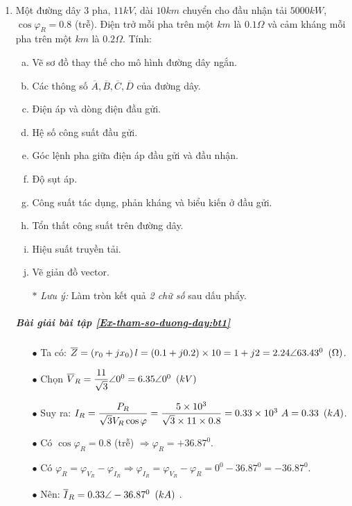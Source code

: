 	\begin{enumerate}
		\item \label{Ex-tham-so-duong-day:bt1} Một đường dây 3 pha, $11 \unit{kV}$, dài $10 \unit{km}$ chuyển cho đầu nhận tải $5000 \unit{kW}$, $\cos \varphi_R = 0.8$ (trễ). Điện trở mỗi pha trên một $km$ là $0.1 \unit{\Omega}$ và cảm kháng mỗi pha trên một $km$ là $0.2 \unit{\Omega}$. Tính:
			\begin{enumerate}[a.]
				\item Vẽ sơ đồ thay thế cho mô hình đường dây ngắn.
				\item Các thông số $\overline{A}, \overline{B}, \overline{C}, \overline{D}$ của đường dây.
				\item Điện áp và dòng điện đầu gửi.
				\item Hệ số công suất đầu gửi.
				\item Góc lệnh pha giữa điện áp đầu gửi và đầu nhận.
				\item Độ sụt áp.
				\item Công suất tác dụng, phản kháng và biểu kiến ở đầu gửi.
				\item Tổn thất công suất trên đường dây.
				\item Hiệu suất truyền tải.
				\item Vẽ giản đồ vector.
				\item[$\ast$] \emph{Lưu ý:} Làm tròn kết quả \emph{2 chữ số} sau dấu phẩy.
			\end{enumerate}
			
		\subparagraph{Bài giải bài tập \ref{Ex-tham-so-duong-day:bt1}}
			\begin{enumerate}[\it a.]
				\item[$\bullet$] Ta có: $\overline{Z} = \left({r_0 + j x_0}\right)l = \left({0.1 +j 0.2}\right)\times 10 = 1 + j 2 = 2.24 \angle 63.43^0 ~\left({\Omega}\right)$.
					
				\item[$\bullet$] Chọn $\overline{V}_R = \dfrac{11}{\sqrt{3}} \angle 0^0 = 6.35 \angle 0^0 ~\left({kV}\right) $
				
				\item[$\bullet$] Suy ra: $I_R = \dfrac{P_R}{\sqrt{3}V_R \cos \varphi} = \dfrac{5\times 10^3}{\sqrt{3} \times 11 \times 0.8} = 0.33 \times 10^3 ~A = 0.33~\left({kA}\right)$.
				
				\item[$\bullet$] Có $\cos \varphi_R = 0.8$ (trễ) $ \Longrightarrow \varphi_R  = +36.87^0$.				
				\item[$\bullet$] Có $\varphi_R = \varphi_{V_R} - \varphi_{I_R} \Longrightarrow \varphi_{I_R} = \varphi_{V_R} - \varphi_R = 0^0 - 36.87^0 = -36.87^0$.
				\item[$\bullet$] Nên: $\overline{I}_R = 0.33 \angle -36.87^0 ~\left({kA}\right)$ .


\end{enumerate}
\end{enumerate}
